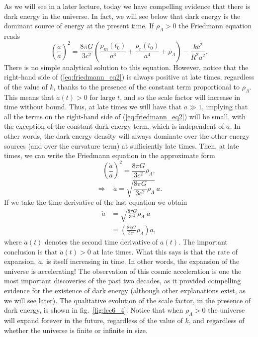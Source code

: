 As we will see in a later lecture, today we have compelling evidence that there is dark energy in the universe. In fact, we will see below that dark energy is the dominant source of energy at the present time. If $\rho_{\Lambda}>0$ the Friedmann equation reads
\begin{equation} \label{eq:friedmann_eq2}
\left(\frac{\dot{a}}{a}\right)^2=\frac{8\pi G}{3c^2}\left( \frac{\rho_m(t_0)}{a^3}+\frac{\rho_r(t_0)}{a^4}+\rho_{\Lambda} \right)-\frac{kc^2}{R^2a^2}.
\end{equation}
There is no simple analytical solution to this equation. However, notice that the right-hand side of (\ref{eq:friedmann_eq2}) is always positive at late times, regardless of the value of $k$, thanks to the presence of the constant term proportional to $\rho_{\Lambda}$. This means that $\dot{a}(t)>0$ for large $t$, and so the scale factor will increase in time without bound. Thus, at late times we will have that $a\gg1$, implying that all the terms on the right-hand side of (\ref{eq:friedmann_eq2}) will be small, with the exception of the constant dark energy term, which is independent of $a$. In other words, the dark energy density will always dominate over the other energy sources (and over the curvature term) at sufficiently late times. Then, at late times, we can write the Friedmann equation in the approximate form
\begin{equation}
\left(\frac{\dot{a}}{a}\right)^2=\frac{8\pi G}{3c^2}\rho_{\Lambda},
\end{equation}
\begin{equation}
\Rightarrow~~~~\dot{a}=\sqrt{\frac{8\pi G}{3c^2}\rho_{\Lambda}}~a.
\end{equation}
If we take the time derivative of the last equation we obtain
\begin{equation}
\begin{split}
\ddot{a}&=\sqrt{\frac{8\pi G}{3c^2}\rho_{\Lambda}}~\dot{a}\\
&=\left(\frac{8\pi G}{3c^2}\rho_{\Lambda}\right) a,
\end{split}
\end{equation}
where $\ddot{a}(t)$ denotes the second time derivative of $a(t)$. The important conclusion is that $\ddot{a}(t)>0$ at late times. What this says is that the rate of expansion, $\dot{a}$, is itself increasing in time. In other words, the expansion of the universe is accelerating! The observation of this cosmic acceleration is one the most important discoveries of the past two decades, as it provided compelling evidence for the existence of dark energy (although other explanations exist, as we will see later). The qualitative evolution of the scale factor, in the presence of dark energy, is shown in fig.\ \ref{fig:lec6_4}. Notice that when $\rho_{\Lambda}>0$ the universe will expand forever in the future, regardless of the value of $k$, and regardless of whether the universe is finite or infinite in size.
